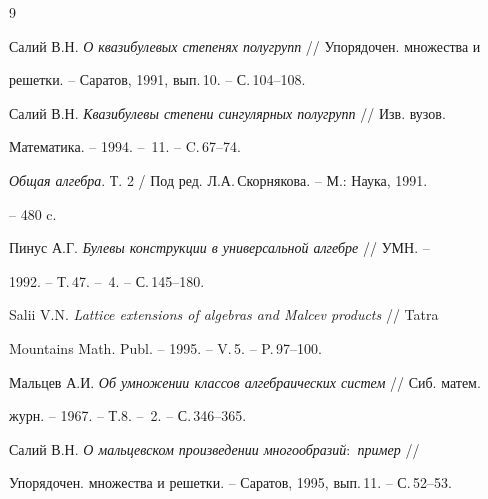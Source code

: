 \begin{thebibliography}{9}







Салий В.Н. {\em О квазибулевых степенях полугрупп} // Упорядочен. множества и


решетки. -- Саратов, 1991, вып.\,10. -- С.\,104--108.




Салий В.Н. {\em Квазибулевы степени сингулярных полугрупп} // Изв. вузов.


Математика. -- 1994. -- \No\,11. -- C.\,67--74.




{\em Общая алгебра}. Т. 2 / Под ред. Л.А.\,Скорнякова. -- М.: Наука, 1991.


-- 480 c.




Пинус А.Г. {\em Булевы конструкции в универсальной алгебре} // УМН. --


1992. -- Т.\,47. -- \No\,4. -- С.\,145--180.




Salii V.N. {\em Lattice extensions of algebras and Malcev products} // Tatra


Mountains Math. Publ. -- 1995. -- V.\,5. -- P.\,97--100.




Мальцев А.И. {\em Об умножении классов алгебраических систем} // Сиб. матем.


журн. -- 1967. -- Т.8. -- \No\,2. -- С.\,346--365.




Салий В.Н. {\em О мальцевском произведении многообразий$:$ пример} //


Упорядочен. множества и решетки. -- Саратов, 1995, вып.\,11. -- С.\,52--53.





\end{thebibliography}





\vskip 2cm












\label{end}





